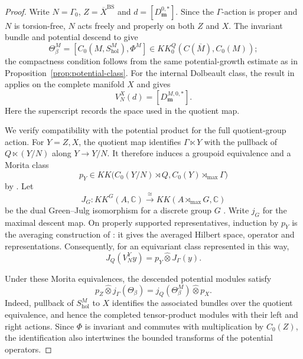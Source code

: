 \documentclass[11pt]{article}
\theoremstyle{definition}
\theoremstyle{plain}
\numberwithin{equation}{section}
\newcommand{\BS}{\mathrm{BS}}
\begin{document}
\begin{proof}
Write $N=\Gamma_0$, $Z=\overline X^{\BS}$ and
$d=[D_{\boldsymbol m}^{0,*}]$.
Since the $\Gamma$-action is proper and $N$ is torsion-free,
$N$ acts freely and properly on both $Z$ and $X$.
The invariant bundle and potential descend to give
\[
 \Theta_\beta^M
   =[C_0(M,S_{\mathrm{hol}}^M),\Phi^M]
   \in KK_0^Q(C(\overline M),C_0(M));
\]
the compactness condition follows from the same potential-growth
estimate as in Proposition~\ref{prop:potential-class}.
For the internal Dolbeault class, the result in
\cite[Theorem~3.12 and \S3.2 fn.~21]{HochsLandsman} applies
on the complete manifold $X$ and gives
\[
 V_N^X(d)=[D_{\boldsymbol m}^{M,0,*}].
\]
Here the superscript records the space used in the quotient map.

We verify compatibility with the potential product for the full
quotient-group action. For $Y=Z,X$, the quotient map
identifies $\Gamma\ltimes Y$ with the pullback of
$Q\ltimes(Y/N)$ along $Y\to Y/N$.
It therefore induces a groupoid equivalence and a Morita class
\[
 p_Y\in KK\bigl(C_0(Y/N)\rtimes Q,
                     C_0(Y)\rtimes_{\max}\Gamma\bigr)
\]
by \cite[Theorem~2.8]{MuhlyRenaultWilliams}.
Let
\[
 J_G:KK^G(A,\mathbb C)
       \xrightarrow{\cong}
       KK(A\rtimes_{\max}G,\mathbb C)
\]
be the dual Green--Julg isomorphism for a discrete group $G$
\cite[Theorem~20.2.7(b)]{Blackadar}.
Write $j_G$ for the maximal descent map.
On properly supported representatives, induction by $p_Y$ is
the averaging construction of \cite[\S3.1]{HochsLandsman}:
it gives the averaged Hilbert space, operator and representations.
Consequently, for an equivariant class represented in this way,
\begin{equation}\label{eq:quotient-morita}
 J_Q(V_N^Y y)=p_Y\widehat\otimes J_\Gamma(y).
\end{equation}

Under these Morita equivalences, the descended potential modules
satisfy
\begin{equation}\label{eq:potential-morita}
 p_Z\widehat\otimes j_\Gamma(\Theta_\beta)
   =j_Q(\Theta_\beta^M)\widehat\otimes p_X.
\end{equation}
Indeed, pullback of $S_{\mathrm{hol}}^M$ to $X$ identifies the
associated bundles over the quotient equivalence, and hence the
completed tensor-product modules with their left and right actions. Since $\Phi$ is invariant and commutes
with multiplication by $C_0(Z)$, the identification also
intertwines the bounded transforms of the potential operators.


\end{proof}
\end{document}
